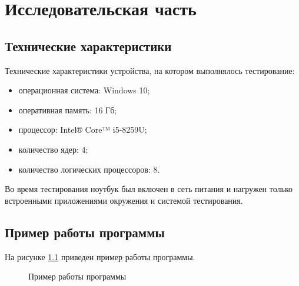 \chapter{Исследовательская часть}

\section{Технические характеристики}

Технические характеристики устройства, на котором выполнялось тестирование:

\begin{itemize}
	\item операционная система: Windows 10;
	\item оперативная память: 16 Гб;
	\item процессор: Intel® Core™ i5-8259U;
	\item количество ядер: 4;
	\item количество логических процессоров: 8.
\end{itemize}

Во время тестирования ноутбук был включен в сеть питания и нагружен только встроенными приложениями окружения и системой тестирования.

\section{Пример работы программы}
На рисунке \ref{fig:work_example} приведен пример работы программы.
\clearpage
\begin{figure}[h!]
	
	
	\caption{Пример работы программы}
	
	\label{fig:work_example}
	
\end{figure}


